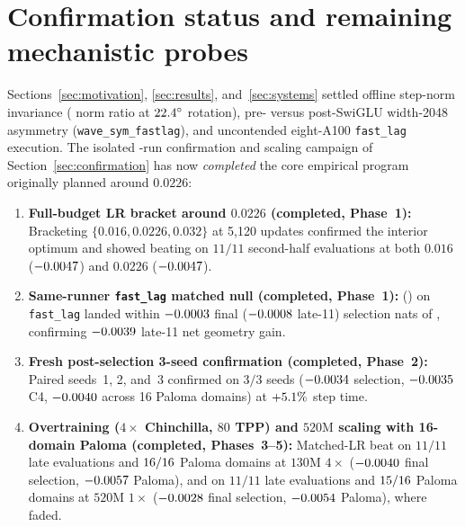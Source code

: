 \section{Confirmation status and remaining mechanistic probes}
\label{sec:program}

Sections~\ref{sec:motivation}, \ref{sec:results}, and~\ref{sec:systems} settled
offline step-norm invariance (\mechMlpdiagGraftNorm{} norm ratio at
$22.4^\circ$ rotation), pre- versus post-SwiGLU width-2048
asymmetry (\texttt{wave\_\allowbreak sym\_\allowbreak fastlag}), and uncontended
eight-A100 \texttt{fast\_lag} execution. The isolated \confTotalRuns{}-run
confirmation and scaling campaign of Section~\ref{sec:confirmation} has now
\emph{completed} the core empirical program originally planned around $0.0226$:
\begin{enumerate}
\item \textbf{Full-budget LR bracket around $0.0226$ (completed, Phase~1):}
  Bracketing $\{0.016, 0.0226, 0.032\}$ at 5{,}120 updates confirmed the
  interior optimum and showed  beating  on
  $11/11$ second-half evaluations at both $0.016$
  ($-0.0047{}$) and $0.0226$
  ($-0.0047{}$).
\item \textbf{Same-runner \texttt{fast\_lag} matched null (completed, Phase~1):}
   (\nullmlp{}) on \texttt{fast\_lag} landed within
  $-0.0003{}$ final ($-0.0008{}$ late-11) selection
  nats of , confirming $-0.0039{}$ late-11
  net geometry gain.
\item \textbf{Fresh post-selection 3-seed confirmation (completed, Phase~2):}
  Paired seeds~1, 2, and~3 confirmed  on $3/3$ seeds
  ($-0.0034{}$ selection, $-0.0035{}$ C4,
  $-0.0040{}$ across 16 Paloma domains) at
  $+5.1\%$ step time.
\item \textbf{Overtraining ($4\times$ Chinchilla, $80$ TPP) and $520\text{M}$
  scaling with 16-domain Paloma (completed, Phases~3--5):}
  Matched-LR  beat  on $11/11$ late evaluations
  and $16{}/16$ Paloma domains at $130\text{M}$ $4\times$
  ($-0.0040{}$ final selection, $-0.0057{}$
  Paloma), and on $11/11$ late evaluations and $15{}/16$
  Paloma domains at $520\text{M}$ $1\times$ ($-0.0028{}$ final
  selection, $-0.0054{}$ Paloma), where  faded.
\end{enumerate}

